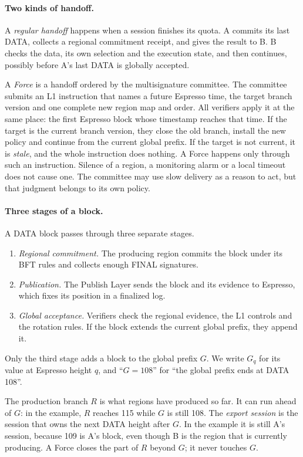 \documentclass[11pt,a4paper]{article}
\newcommand{\defterm}[1]{\textcolor{rrBlue}{\textit{#1}}}
\begin{document}
\paragraph{Two kinds of handoff.}
A \defterm{regular handoff} happens when a session finishes its quota.
A commits its last DATA, collects a regional commitment receipt, and
gives the result to B. B checks the data, its own selection and the
execution state, and then continues, possibly before A's last
DATA is globally accepted.

A \defterm{Force} is a handoff ordered by the multisignature committee.
The committee submits an L1 instruction that names a future Espresso
time, the target branch version and one complete new region map and order. All
verifiers apply it at the same place: the first Espresso block whose
timestamp reaches that time. If the target is the current branch
version, they close the old branch, install the new policy and continue
from the current global prefix. If the target is not current, it is
\emph{stale}, and the whole instruction does nothing. A Force happens
only through such an instruction. Silence of a region, a monitoring
alarm or a local timeout does not cause one. The committee may use slow
delivery as a reason to act, but that judgment belongs to its own
policy.

\paragraph{Three stages of a block.}
A DATA block passes through three separate stages.
\begin{enumerate}
\item \emph{Regional commitment.} The producing region commits the block
under its BFT rules and collects enough FINAL signatures.
\item \emph{Publication.} The Publish Layer sends the block and its
evidence to Espresso, which fixes its position in a finalized log.
\item \emph{Global acceptance.} Verifiers check the regional evidence,
the L1 controls and the rotation rules. If the block extends the
current global prefix, they append it.
\end{enumerate}
Only the third stage adds a block to the global prefix $G$.
We write $G_q$ for its value at Espresso height $q$, and ``$G=108$'' for
``the global prefix ends at DATA 108''.

The production branch $R$ is what regions have produced so
far. It can run ahead of $G$: in the example, $R$ reaches 115 while
$G$ is still 108. The \defterm{export session} is the session that owns
the next DATA height after $G$. In the example it is still A's
session, because 109 is A's block, even though B is the region that is
currently producing. A Force closes the part of $R$ beyond $G$; it
never touches $G$.
\end{document}
